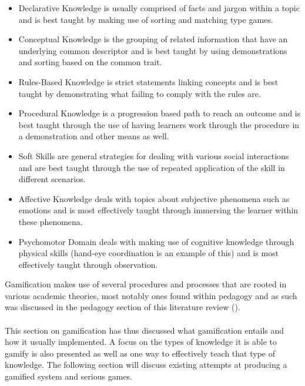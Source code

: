\begin{itemize}
\item Declarative Knowledge is usually comprised of facts and jargon within a topic and is best taught by making use of sorting and matching type games.
\item Conceptual Knowledge is the grouping of related information that have an underlying common descriptor and is best taught by using demonstrations and sorting based on the common trait.
\item Rules-Based Knowledge is strict statements linking concepts and is best taught by demonstrating what failing to comply with the rules are.
\item Procedural Knowledge is a progression based path to reach an outcome and is best taught through the use of having learners work through the procedure in a demonstration and other means as well.
\item Soft Skills are general strategies for dealing with various social interactions and are best taught through the use of repeated application of the skill in different scenarios.
\item Affective Knowledge deals with topics about subjective phenomena such as emotions and is most effectively taught through immersing the learner within these phenomena.

\item Psychomotor Domain deals with making use of cognitive knowledge through physical skills (hand-eye coordination is an example of this) and is most effectively taught through observation.
\end{itemize}
Gamification makes use of several procedures and processes that are rooted in various academic theories, most notably ones found within pedagogy and as such was discussed in the pedagogy section of this literature review (\cite{KappArticle2012}).
\\\\
This section on gamification has thus discussed what gamification entails and how it usually implemented. A focus on the types of knowledge it is able to gamify is also presented as well as one way to effectively teach that type of knowledge. The following section will discuss existing attempts at producing a gamified system and serious games.

